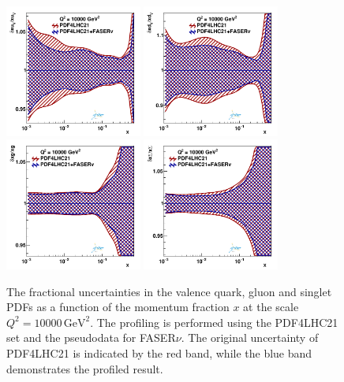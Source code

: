 \documentclass[11pt,a4paper]{article}
\numberwithin{equation}{section}
\numberwithin{figure}{section}
\numberwithin{table}{section}
\begin{document}
{\begin{figure}[H]
\centering
\includegraphics[width=0.4\textwidth]{./figs_xFitter/FASERv_q2_10000_pdf_uv_ratio.pdf}
\includegraphics[width=0.4\textwidth]{./figs_xFitter/FASERv_q2_10000_pdf_dv_ratio.pdf}\\
\includegraphics[width=0.4\textwidth]{./figs_xFitter/FASERv_q2_10000_pdf_g_ratio.pdf}
\includegraphics[width=0.4\textwidth]{./figs_xFitter/FASERv_q2_10000_pdf_Sea_ratio.pdf}
\caption{The fractional uncertainties in the valence quark, gluon and singlet PDFs as a function of the momentum fraction $x$ at the scale $Q^2 = 10000 \, \textrm{GeV}^2$. The profiling is performed using the
PDF4LHC21 set and the pseudodata for FASER$\nu$. The original uncertainty of PDF4LHC21 is
indicated by the red band, while the blue band demonstrates the profiled result.}
\label{FASERv_profiling}
\end{figure}

}
\end{document}
